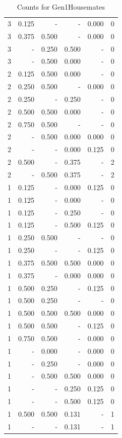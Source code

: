 \documentclass[a4paper]{article}\usepackage{graphicx, color}
\begin{document}
\begin{table}[ht]
\begin{tabular}{rrrrrr}
   \rowcolor{nullColor} 3 & 0.125 & - & - & 0.000 & 0 \\ 
  3 & 0.375 & 0.500 & - & 0.000 & 0 \\ 
   \rowcolor{badColor} 3 & - & 0.250 & 0.500 & - & 0 \\ 
   \rowcolor{badColor} 3 & - & 0.500 & 0.000 & - & 0 \\ 
   \rowcolor{badColor} 2 & 0.125 & 0.500 & 0.000 & - & 0 \\ 
  2 & 0.250 & 0.500 & - & 0.000 & 0 \\ 
   \rowcolor{sosoColor} 2 & 0.250 & - & 0.250 & - & 0 \\ 
   \rowcolor{badColor} 2 & 0.500 & 0.500 & 0.000 & - & 0 \\ 
  2 & 0.750 & 0.500 & - & - & 0 \\ 
   \rowcolor{badColor} 2 & - & 0.500 & 0.000 & 0.000 & 0 \\ 
   \rowcolor{sosoColor} 2 & - & - & 0.000 & 0.125 & 0 \\ 
   \rowcolor{sosoColor} 2 & 0.500 & - & 0.375 & - & 2 \\ 
  2 & - & 0.500 & 0.375 & - & 2 \\ 
   \rowcolor{sosoColor} 1 & 0.125 & - & 0.000 & 0.125 & 0 \\ 
   \rowcolor{sosoColor} 1 & 0.125 & - & 0.000 & - & 0 \\ 
   \rowcolor{sosoColor} 1 & 0.125 & - & 0.250 & - & 0 \\ 
   \rowcolor{sosoColor} 1 & 0.125 & - & 0.500 & 0.125 & 0 \\ 
  1 & 0.250 & 0.500 & - & - & 0 \\ 
   \rowcolor{nullColor} 1 & 0.250 & - & - & 0.125 & 0 \\ 
   \rowcolor{goodColor} 1 & 0.375 & 0.500 & 0.500 & 0.000 & 0 \\ 
   \rowcolor{sosoColor} 1 & 0.375 & - & 0.000 & 0.000 & 0 \\ 
  1 & 0.500 & 0.250 & - & 0.125 & 0 \\ 
  1 & 0.500 & 0.250 & - & - & 0 \\ 
   \rowcolor{goodColor} 1 & 0.500 & 0.500 & 0.500 & 0.000 & 0 \\ 
  1 & 0.500 & 0.500 & - & 0.125 & 0 \\ 
  1 & 0.750 & 0.500 & - & 0.000 & 0 \\ 
  1 & - & 0.000 & - & 0.000 & 0 \\ 
  1 & - & 0.250 & - & 0.000 & 0 \\ 
   \rowcolor{goodColor} 1 & - & 0.500 & 0.500 & 0.000 & 0 \\ 
   \rowcolor{sosoColor} 1 & - & - & 0.250 & 0.125 & 0 \\ 
   \rowcolor{sosoColor} 1 & - & - & 0.500 & 0.125 & 0 \\ 
   \rowcolor{badColor} 1 & 0.500 & 0.500 & 0.131 & - & 1 \\ 
   \rowcolor{sosoColor} 1 & - & - & 0.131 & - & 1 \\ 
   \hline
\end{tabular}
\caption{Counts for Gen1Housemates} 
\end{table}
\end{document}
